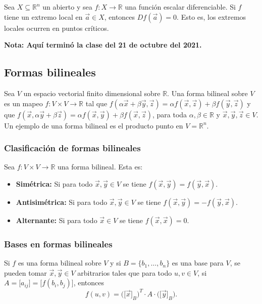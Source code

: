 \documentclass{article}
\begin{document}
Sea $X\subseteq\mathbb{R}^n$ un abierto y sea $f:X\to\mathbb{R}$ una función escalar diferenciable. Si $f$ tiene un extremo local en $\vec{a}\in X$, entonces $Df(\vec{a})=0$. Esto es, los extremos locales ocurren en puntos críticos.

\vspace{10pt}
\textbf{Nota: Aquí terminó la clase del 21 de octubre del 2021.}

\subsection*{Formas bilineales}

Sea $V$ un espacio vectorial finito dimensional sobre $\mathbb{R}$. Una forma bilineal sobre $V$ es un mapeo $f:V\times V\to\mathbb{R}$ tal que $f(\alpha \vec{x}+\beta \vec{y},\vec{z})=\alpha f(\vec{x},\vec{z})+\beta f(\vec{y},\vec{z})$ y que $f(\vec{x},\alpha \vec{y}+\beta \vec{z})=\alpha f(\vec{x},\vec{y})+\beta f(\vec{x},\vec{z})$, para toda $\alpha,\beta\in\mathbb{R}$ y $\vec{x},\vec{y},\vec{z}\in V$. Un ejemplo de una forma bilineal es el producto punto en $V=\mathbb{R}^n$.

\subsubsection*{Clasificación de formas bilineales}

Sea $f:V\times V\to\mathbb{R}$ una forma bilineal. Esta es:

\begin{itemize}

\item \textbf{Simétrica:} Si para todo $\vec{x},\vec{y}\in V$ se tiene $f(\vec{x},\vec{y})=f(\vec{y},\vec{x})$.

\item \textbf{Antisimétrica:} Si para todo $\vec{x},\vec{y}\in V$ se tiene $f(\vec{x},\vec{y})=-f(\vec{y},\vec{x})$.

\item \textbf{Alternante:} Si para todo $\vec{x}\in V$ se tiene $f(\vec{x},\vec{x})=0$.

\end{itemize}

\subsubsection*{Bases en formas bilineales}

Si $f$ es una forma bilineal sobre $V$ y si $B=\{b_1,\ldots,b_n\}$ es una base para $V$, se pueden tomar $\vec{x},\vec{y}\in V$ arbitrarios tales que para todo $u,v\in V$, si $A=\big[a_{ij}\big]=\big[f(b_i,b_j)\big]$, entonces
$$f(u,v)=\big(\big[\vec{x}\big]_B\big)^T \cdot A \cdot \big(\big[\vec{y}\big]_B\big).$$
\end{document}
